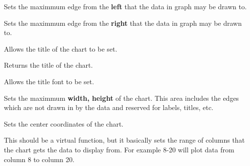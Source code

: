 
Sets the maximmum edge from the {\bf left} that the data in graph may be drawn to.

\label{setedgeright}


Sets the maximmum edge from the {\bf right} that the data in graph may be drawn to.

\label{settitle}


Allows the title of the chart to be set.

\label{gettitle}


Returns the title of the chart.

\label{settitlefont}


Allows the title font to be set.

\label{gettitlefont}

	
\label{setmaxwidthheight}

	
Sets the maximmum {\bf width, height} of the chart. This area
includes the edges which are not drawn in by the data and
reserved for labels, titles, etc. 


\label{setchartcenter}

	
Sets the center coordinates of the chart.

\label{setstartendcol}


This should be a virtual function, but it basically sets the range of
columns that the chart gets the data to display from. For example 8-20 will plot
data from column 8 to column 20. 

